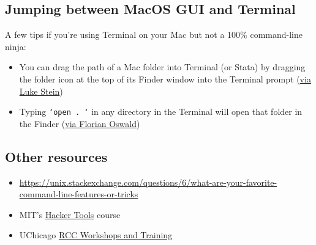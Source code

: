 \subsection{Jumping between MacOS GUI and Terminal}

A few tips if you're using Terminal on your Mac but not a 100\% command-line ninja:
\begin{itemize}
	\item You can drag the path of a Mac folder into Terminal (or Stata) by dragging the folder icon at the top of its Finder window into the Terminal prompt (\href{https://twitter.com/lukestein/status/1179792864630296578}{via Luke Stein})
	\item Typing \texttt{`open . `} in any directory in the Terminal will open that folder in the Finder (\href{https://twitter.com/FlorianOswald/status/1179779138892292096}{via Florian Oswald})
\end{itemize}

\subsection{Other resources}

\begin{itemize}
	\item \url{https://unix.stackexchange.com/questions/6/what-are-your-favorite-command-line-features-or-tricks}
	\item MIT's \href{https://hacker-tools.github.io/}{Hacker Tools} course
	\item UChicago \href{https://rcc.uchicago.edu/support-and-services/workshops-and-training}{RCC Workshops and Training}
\end{itemize}
